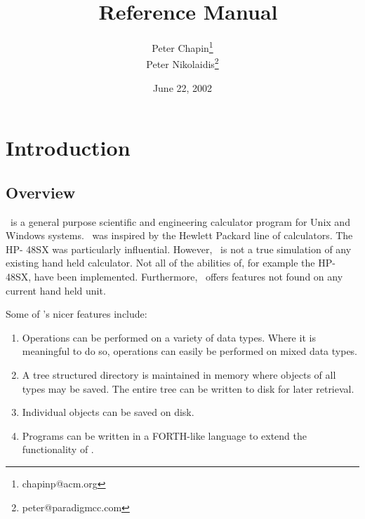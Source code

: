 \documentclass{report}
\begin{document}
\title{\CLAC\ Reference Manual}
\author{Peter Chapin\thanks{chapinp@acm.org}\\
        Peter Nikolaidis\thanks{peter@paradigmcc.com}}
\date{June 22, 2002}
\maketitle

\tableofcontents
\newpage
{}

\chapter{Introduction}

\section{Overview}

\CLAC\ is a general purpose scientific and engineering calculator program for Unix and Windows
systems. \CLAC\ was inspired by the Hewlett Packard line of calculators. The HP- 48SX was
particularly influential. However, \CLAC\ is not a true simulation of any existing hand held
calculator. Not all of the abilities of, for example the HP-48SX, have been implemented.
Furthermore, \CLAC\ offers features not found on any current hand held unit.

Some of \CLAC's nicer features include:

\begin{enumerate}
  
\item Operations can be performed on a variety of data types. Where it is meaningful to do so,
  operations can easily be performed on mixed data types.
  
\item A tree structured directory is maintained in memory where objects of all types may be
  saved. The entire tree can be written to disk for later retrieval.

\item Individual objects can be saved on disk.
  
\item Programs can be written in a FORTH-like language to extend the functionality of \CLAC.

\end{enumerate}
\end{document}
